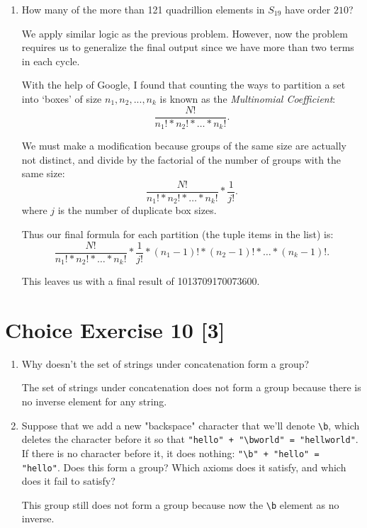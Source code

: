 \documentclass{article}
\begin{document}
\begin{enumerate}
        This leaves us with a final result of 2688.

    \item
        How many of the more than 121 quadrillion elements in \(S_{19}\) have order \(210\)?

        We apply similar logic as the previous problem. However, now the problem 
        requires us to generalize the final output since we have more than 
        two terms in each cycle.

        

        With the help of Google, I found that counting the ways to partition a 
        set into `boxes' of size \(n_1, n_2, ..., n_k\) is known as the \emph{Multinomial Coefficient}:
        $$\frac{N!}{n_1! * n_2! * \dots * n_k!}.$$

        We must make a modification because groups of the same size are actually 
        not distinct, and divide by the factorial of the number of groups with the 
        same size:
        $$\frac{N!}{n_1! * n_2! * \dots * n_k!} * \frac{1}{j!}.$$
        where \(j\) is the number of duplicate box sizes.

        

        Thus our final formula for each partition (the tuple items in the list) is:
        \[
            \frac{N!}{n_1! * n_2! * \dots * n_k!} * \frac{1}{j!} * (n_1-1)! * (n_2-1)! * \dots * (n_k-1)!.
        \]

        

        This leaves us with a final result of 1013709170073600.
    
\end{enumerate}
\pagebreak

\section*{Choice Exercise 10 [3]}
\begin{enumerate}
    \item 
        Why doesn't the set of strings under concatenation form a group?

        The set of strings under concatenation does not form a group because there 
        is no inverse element for any string.

    \item 
        Suppose that we add a new "backspace" character that we'll denote \verb|\b|, 
        which deletes the character before it so that
        \verb|"hello" + "\bworld" = "hellworld"|.
        If there is no character before it, it does nothing:
        \verb|"\b" + "hello" = "hello"|.
        Does this form a group? Which axioms does it satisfy, and which does it fail to satisfy?

        This group still does not form a group because now the \verb|\b| element
        as no inverse.
    
\end{enumerate}
\end{document}
